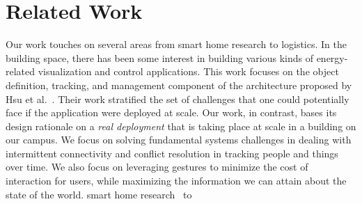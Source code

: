 
\section{Related Work}

Our work touches on several areas from smart home research to logistics.  In the building space, there has been
some interest in building various kinds of energy-related visualization and control applications.
This work focuses on the object definition, tracking, and management component of the architecture proposed by 
Hsu et al.~\cite{hbci}.  Their work stratified the set of challenges that one could potentially face if the application 
were deployed at scale.  Our
work, in contrast, bases its design rationale on a \emph{real deployment} that is taking place at scale in a building 
on our campus.  We focus on solving fundamental systems challenges in dealing with intermittent connectivity
and conflict resolution in tracking people and things over time.  We also focus on leveraging gestures to minimize
the cost of interaction for users, while maximizing the information we can attain about the state of the world.
smart home research~\cite{cooltown} to

